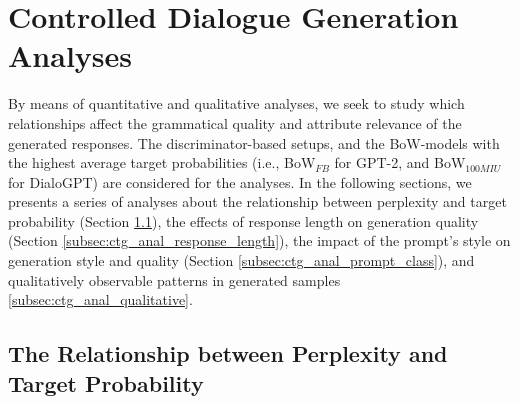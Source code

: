 










\section{Controlled Dialogue Generation Analyses}
\label{sec:exp2_analyses}

By means of quantitative and qualitative analyses, we seek to study which relationships affect the grammatical quality and attribute relevance of the generated responses. The discriminator-based setups, and the BoW-models with the highest average target probabilities (i.e., BoW$_{FB}$ for GPT-2, and BoW$_{100MIU}$ for DialoGPT) are considered for the analyses. In the following sections, we presents a series of analyses about the relationship between perplexity and target probability (Section \ref{subsec:ctg_anal_ppl_target_prob}), the effects of response length on generation quality (Section \ref{subsec:ctg_anal_response_length}), the impact of the prompt's style on generation style and quality (Section \ref{subsec:ctg_anal_prompt_class}), and qualitatively observable patterns in generated samples \ref{subsec:ctg_anal_qualitative}.




\subsection{The Relationship between Perplexity and Target Probability }
\label{subsec:ctg_anal_ppl_target_prob}



